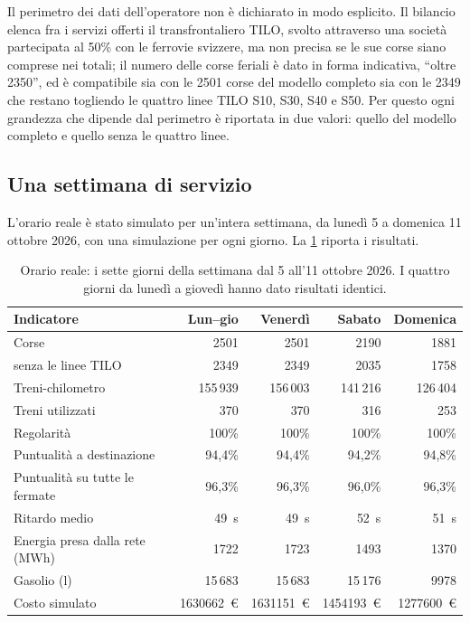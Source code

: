 Il perimetro dei dati dell'operatore non è dichiarato in modo esplicito. Il bilancio elenca fra i servizi offerti il transfrontaliero TILO, svolto attraverso una società partecipata al 50\% con le ferrovie svizzere, ma non precisa se le sue corse siano comprese nei totali; il numero delle corse feriali è dato in forma indicativa, \enquote{oltre 2350}, ed è compatibile sia con le 2501 corse del modello completo sia con le 2349 che restano togliendo le quattro linee TILO S10, S30, S40 e S50. Per questo ogni grandezza che dipende dal perimetro è riportata in due valori: quello del modello completo e quello senza le quattro linee.

\subsection{Una settimana di servizio}
L'orario reale è stato simulato per un'intera settimana, da lunedì 5 a domenica 11 ottobre 2026, con una simulazione per ogni giorno. La \cref{tab:validazione-settimana} riporta i risultati.

\begin{table}[H]
	\centering
	\caption{Orario reale: i sette giorni della settimana dal 5 all'11 ottobre 2026. I quattro giorni da lunedì a giovedì hanno dato risultati identici.}
	\label{tab:validazione-settimana}
	\begin{tabularx}{\textwidth}{Xrrrr}
		\toprule
		Indicatore & Lun–gio & Venerdì & Sabato & Domenica \\
		\midrule
		Corse & 2501 & 2501 & 2190 & 1881 \\
		\quad senza le linee TILO & 2349 & 2349 & 2035 & 1758 \\
		Treni-chilometro & 155\,939 & 156\,003 & 141\,216 & 126\,404 \\
		Treni utilizzati & 370 & 370 & 316 & 253 \\
		Regolarità & 100\% & 100\% & 100\% & 100\% \\
		Puntualità a destinazione & 94,4\% & 94,4\% & 94,2\% & 94,8\% \\
		Puntualità su tutte le fermate & 96,3\% & 96,3\% & 96,0\% & 96,3\% \\
		Ritardo medio & \SI{49}{\second} & \SI{49}{\second} & \SI{52}{\second} & \SI{51}{\second} \\
		Energia presa dalla rete (MWh) & 1722 & 1723 & 1493 & 1370 \\
		Gasolio (l) & 15\,683 & 15\,683 & 15\,176 & 9978 \\
		Costo simulato & \SI{1630662}{\euro} & \SI{1631151}{\euro} & \SI{1454193}{\euro} & \SI{1277600}{\euro} \\
		\bottomrule
	\end{tabularx}
\end{table}

